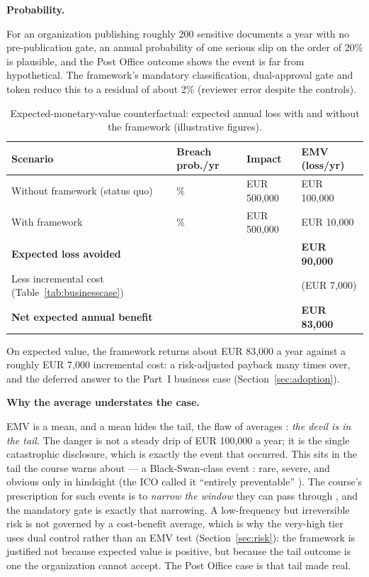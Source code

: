 \documentclass[12pt,a4paper]{article}
\begin{document}
\noindent\textbf{Probability.}\par
For an organization publishing roughly 200 sensitive documents a year with no pre-publication gate, an annual probability of one serious slip on the order of 20\% is plausible, and the Post Office outcome shows the event is far from hypothetical. The framework's mandatory classification, dual-approval gate and token reduce this to a residual of about 2\% (reviewer error despite the controls).

\begin{table}[H]
\centering
\small
{}
\begin{tabular}{@{} p{5.6cm} >{\centering\arraybackslash}p{2.6cm} >{\raggedleft\arraybackslash}p{2.4cm} >{\raggedleft\arraybackslash}p{2.6cm} @{}}
\toprule
\textbf{\color{accentdark}Scenario} & \textbf{\color{accentdark}Breach prob./yr} & \textbf{\color{accentdark}Impact} & \textbf{\color{accentdark}EMV (loss/yr)} \\
\midrule
Without framework (status quo) & 20\% & EUR 500,000 & EUR 100,000 \\
With framework & 2\% & EUR 500,000 & EUR 10,000 \\
\textbf{Expected loss avoided} & & & \textbf{EUR 90,000} \\
Less incremental cost (Table~\ref{tab:businesscase}) & & & (EUR 7,000) \\
\textbf{Net expected annual benefit} & & & \textbf{EUR 83,000} \\
\bottomrule
\end{tabular}
\caption{Expected-monetary-value counterfactual: expected annual loss with and without the framework (illustrative figures).}
\label{tab:emv}
\end{table}

On expected value, the framework returns about EUR 83,000 a year against a roughly EUR 7,000 incremental cost: a risk-adjusted payback many times over, and the deferred answer to the Part~I business case (Section~\ref{sec:adoption}).

\noindent\textbf{Why the average understates the case.}\par
EMV is a mean, and a mean hides the tail, the flaw of averages \cite{falchi_slides}: \emph{the devil is in the tail}. The danger is not a steady drip of EUR 100,000 a year; it is the single catastrophic disclosure, which is exactly the event that occurred. This sits in the tail the course warns about --- a Black-Swan-class event \cite{falchi_slides}: rare, severe, and obvious only in hindsight (the ICO called it ``entirely preventable'' \cite{ico2025}). The course's prescription for such events is to \emph{narrow the window} they can pass through \cite{falchi_slides}, and the mandatory gate is exactly that narrowing. A low-frequency but irreversible risk is not governed by a cost-benefit average, which is why the very-high tier uses dual control rather than an EMV test (Section~\ref{sec:risk}): the framework is justified not because expected value is positive, but because the tail outcome is one the organization cannot accept. The Post Office case is that tail made real.
\end{document}
